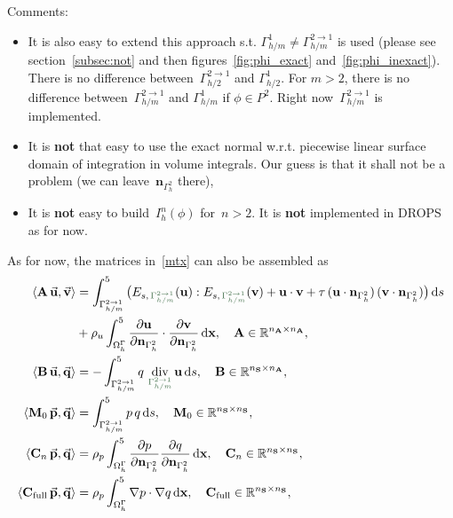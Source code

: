 \documentclass[12pt]{article}
\newcommand{\vect}[1]{\boldsymbol{\mathbf{#1}}}
\newcommand*\diff{\mathop{}\!\mathrm{d}}
\DeclareMathOperator{\Div}{div}
\begin{document}
Comments:
\begin{itemize}
	\item It is also easy to extend this approach s.t. $\Gamma_{h/m}^1 \ne \Gamma_{h/m}^{2 \rightarrow 1}$  is used (please see section~\ref{subsec:not} and then figures~\ref{fig:phi_exact} and~\ref{fig:phi_inexact}). There is no difference between~$\Gamma_{h/2}^{2 \rightarrow 1}$ and $\Gamma_{h/2}^1$. For $m > 2$, there is no difference between~$\Gamma_{h/m}^{2 \rightarrow 1}$ and $\Gamma_{h/m}^1$ if $\phi \in P^2$. Right now~$\Gamma_{h/m}^{2 \rightarrow 1}$ is implemented.
	\item It is \textbf{not} that easy to use the exact normal w.r.t. piecewise linear surface domain of integration in volume integrals. Our guess is that it shall not be a problem (we can leave~$\vect n_{\Gamma_h^2}$ there),
	\item It is \textbf{not} easy to build~$I_{h}^n(\phi)$ for~$n > 2$. It is \textbf{not} implemented in DROPS as for now.
\end{itemize}
As for now, the matrices in~\eqref{mtx} can also be assembled as
\begin{align}\begin{split}\label{mtx_exact_2}
	\langle \vect A\,\vec{\vect u}, \vec{\vect v} \rangle &= 
		\int^5_{\Gamma_{h/m}^{2 \to 1}} \big( E_{s,\,\textcolor{DarkGreen}{\Gamma_{h/m}^{2 \to 1}}}(\vect u) : E_{s,\,\textcolor{DarkGreen}{\Gamma_{h/m}^{2 \to 1}}}(\vect v) + \vect u\cdot\vect v + \tau\,(\vect u\cdot\vect n_{\Gamma_{h}^2})\,(\vect v\cdot\vect n_{\Gamma_{h}^2}) \big) \diff{s} \\
	&
		+ \rho_u \int^5_{\Omega_h^{\Gamma}} \frac{\partial \vect u}{\partial\vect n_{\Gamma_{h}^2}}\cdot\frac{\partial \vect v}{\partial\vect n_{\Gamma_{h}^2}} \diff{\vect x}, \quad \vect A \in \mathbb R^{n_{\vect A} \times n_{\vect A}},\\
	\langle \vect B\,\vec{\vect u}, \vec{\vect q} \rangle &= 
		-\int^5_{\Gamma_{h/m}^{2 \to 1}} q\,\Div_{\textcolor{DarkGreen}{\Gamma_{h/m}^{2 \to 1}}} \vect u \diff{s}, \quad \vect B \in \mathbb R^{n_{\vect S} \times n_{\vect A}},\\
	\langle \vect M_0\,\vec{\vect p}, \vec{\vect q} \rangle &=
		\int^5_{\Gamma_{h/m}^{2 \to 1}} p\,q \diff{s}, \quad \vect M_0 \in \mathbb R^{n_{\vect S} \times n_{\vect S}},\\
	\langle \vect C_n\,\vec{\vect p}, \vec{\vect q} \rangle &=
		\rho_p \int^5_{\Omega^{\Gamma}_h} \frac{\partial p}{\partial\vect n_{\Gamma_{h}^2}} \frac{\partial q}{\partial\vect n_{\Gamma_{h}^2}} \diff{\vect x}, \quad \vect C_n \in \mathbb R^{n_{\vect S} \times n_{\vect S}},\\
	\langle \vect C_{\text{full}}\,\vec{\vect p}, \vec{\vect q} \rangle &=
		\rho_p \int^5_{\Omega^{\Gamma}_h} \nabla p \cdot \nabla q \diff{\vect x}, \quad \vect C_{\text{full}} \in \mathbb R^{n_{\vect S} \times n_{\vect S}},
\end{split}\end{align}
\end{document}
